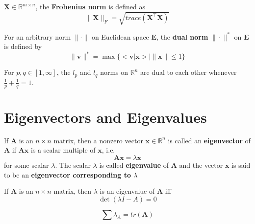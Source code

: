 			\begin{definition}
				$\mathbf{X} \in \mathbb{R}^{m \times n}$, the \textbf{Frobenius norm} is defined as
				\begin{equation}
					\|\mathbf{X}\|_F = \sqrt{trace(\mathbf{X}^\top \mathbf{X})}
				\end{equation}
			\end{definition}

			\begin{definition}
				For an arbitrary norm $\|\cdot\|$ on Euclidean space $\mathbf{E}$, the \textbf{dual norm} $\|\cdot\|^*$ on $\mathbf{E}$ is defined by
				\begin{equation}
					\|\mathbf{v}\|^* = \max \{<\mathbf{v}|\mathbf{x}>|\|\mathbf{x}\| \le 1\}
				\end{equation}
			\end{definition}

			For $p, q \in [1, \infty]$, the $l_p$ and $l_q$ norms on $\mathbb{R}^n$ are dual to each other whenever $\frac1p + \frac1q = 1$.

		\section{Eigenvectors and Eigenvalues}
			\begin{definition}
				If $\mathbf{A}$ is an $n \times n$ matrix, then a nonzero vector $\mathbf{x} \in \mathbb{R}^n$ is called an \textbf{eigenvector} of $\mathbf{A}$ if $\mathbf{Ax}$ is a scalar multiple of $\mathbf{x}$, i.e.
				\begin{equation}
					\mathbf{Ax} = \lambda \mathbf{x}
				\end{equation}
				for some scalar $\lambda$. The scalar $\lambda$ is called \textbf{eigenvalue} of $\mathbf{A}$ and the vector $\mathbf{x}$ is said to be an \textbf{eigenvector corresponding to $\lambda$}
			\end{definition}

			\begin{theorem}
				If $\mathbf{A}$ is an $n \times n$ matrix, then $\lambda$ is an eigenvalue of $\mathbf{A}$ iff
				\begin{equation}
					\det(\lambda I - A) = 0
				\end{equation}
			\end{theorem}

			\begin{corollary}
				\begin{equation}
					\sum \lambda_A = tr(\mathbf{A})
				\end{equation}
			\end{corollary}

